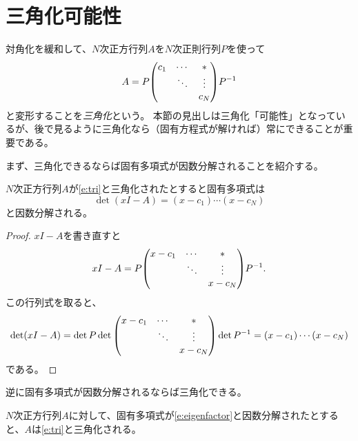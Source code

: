 \section{三角化可能性}

対角化を緩和して、$N$次正方行列$A$を$N$次正則行列$P$を使って
\begin{equation}
\label{e:tri}
A = P\mqty(c_1 & \cdots & * \\ & \ddots & \vdots \\ & & c_N)P^{-1}
\end{equation}
と変形することを\emph{三角化}という。
本節の見出しは三角化「可能性」となっているが、後で見るように三角化なら（固有方程式が解ければ）常にできることが重要である。

まず、三角化できるならば固有多項式が因数分解されることを紹介する。

\begin{proposition}
\label{t:eigenfactor}
$N$次正方行列$A$が\eqref{e:tri}と三角化されたとすると固有多項式は
\begin{equation}
\label{e:eigenfactor}
\det(x I-A) = (x-c_1)\cdots(x-c_N)
\end{equation}
と因数分解される。
\end{proposition}

\begin{proof}
$x I-A$を書き直すと
$$
x I-A = P\mqty(x-c_1 & \cdots & * \\ & \ddots & \vdots \\ & & x-c_N)P^{-1}.
$$
この行列式を取ると、
$$
\det(x I-A)
= \det P\det\mqty(x-c_1 & \cdots & * \\ & \ddots & \vdots \\ & & x-c_N)\det P^{-1}
= (x-c_1)\cdots(x-c_N)
$$
である。
\end{proof}

逆に固有多項式が因数分解されるならば三角化できる。

\begin{theorem}[一般の三角化]
\label{t:tri}
$N$次正方行列$A$に対して、固有多項式が\eqref{e:eigenfactor}と因数分解されたとすると、$A$は\eqref{e:tri}と三角化される。
\end{theorem}


